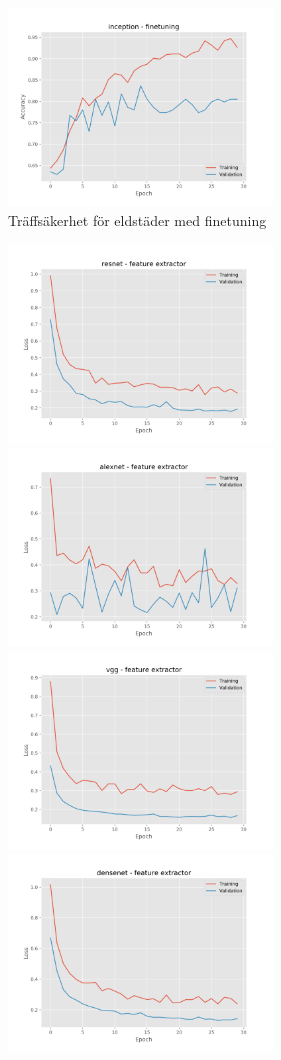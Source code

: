 \documentclass[]{kththesis}
\begin{document}
\begin{figure}[h]
    \includegraphics[width=7cm]{f_a_inception_fine}
    \caption{Träffsäkerhet för eldstäder med finetuning}
    \label{fig:f_a_2}
  \end{figure}
  
  \begin{figure}[h]
    \includegraphics[width=7cm]{r_l_resnet_fe}
    \includegraphics[width=7cm]{r_l_alexnet_fe}
    \includegraphics[width=7cm]{r_l_vgg_fe}
    \includegraphics[width=7cm]{r_l_densenet_fe}

\end{figure}
\end{document}
